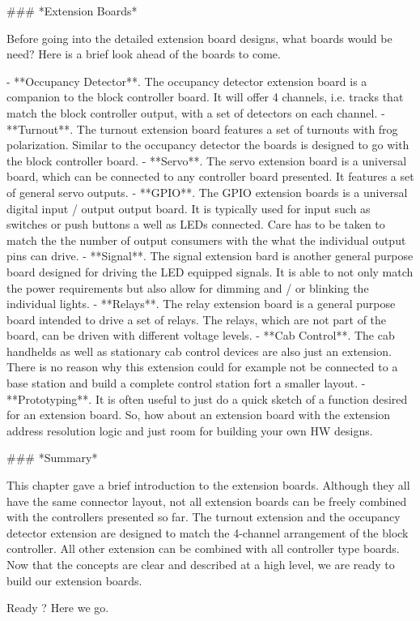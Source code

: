 ### *Extension Boards*

Before going into the detailed extension board designs, what boards would be need? Here is a brief look ahead of the boards to come.

- **Occupancy Detector**. The occupancy detector extension board is a companion to the block controller board. It will offer 4 channels, i.e. tracks that match the block controller output, with a set of detectors on each channel.
- **Turnout**. The turnout extension board features a set of turnouts with frog polarization. Similar to the occupancy detector the boards is designed to go with the block controller board.
- **Servo**. The servo extension board is a universal board, which can be connected to any controller board presented. It features a set of general servo outputs.
- **GPIO**. The GPIO extension boards is a universal digital input / output output board. It is typically used for input such as switches or push buttons a well as LEDs connected. Care has to be taken to match the the number of output consumers with the what the individual output pins can drive.
- **Signal**. The signal extension bard is another general purpose board designed for driving the LED equipped signals. It is able to not only match the power requirements but also allow for dimming and / or blinking the individual lights.
- **Relays**. The relay extension board is a general purpose board intended to drive a set of relays. The relays, which are not part of the board, can be driven with different voltage levels.
- **Cab Control**. The cab handhelds as well as stationary cab control devices are also just an extension. There is no reason why this extension could for example not be connected to a base station and build a complete control station fort a smaller layout.
- **Prototyping**. It is often useful to just do a quick sketch of a function desired for an extension board. So, how about an extension board with the extension address resolution logic and just room for building your own HW designs.

### *Summary*

This chapter gave a brief introduction to the extension boards. Although they all have the same connector layout, not all extension boards can be freely combined with the controllers presented so far. The turnout extension and the occupancy detector extension are designed to match the 4-channel arrangement of the block controller. All other extension can be combined with all controller type boards. Now that the concepts are clear and described at a high level, we are ready to build our extension boards.

Ready ? Here we go.